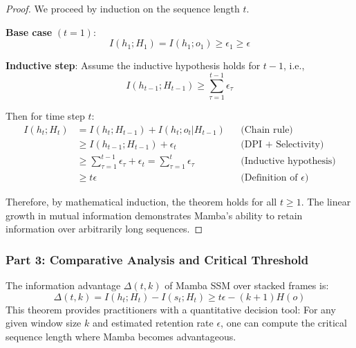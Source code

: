 \begin{proof}
We proceed by induction on the sequence length $t$.

\textbf{Base case} $(t=1)$:
\begin{equation}
    I(h_1; H_1) = I(h_1; o_1) \geq \epsilon_1 \geq \epsilon
\end{equation}

\textbf{Inductive step}:
Assume the inductive hypothesis holds for $t-1$, i.e.,
\begin{equation}
    I(h_{t-1}; H_{t-1}) \geq \sum_{\tau=1}^{t-1} \epsilon_\tau
\end{equation}

Then for time step $t$:
\begin{align}
    I(h_t; H_t) &= I(h_t; H_{t-1}) + I(h_t; o_t|H_{t-1}) && \text{(Chain rule)} \\
    &\geq I(h_{t-1}; H_{t-1}) + \epsilon_t && \text{(DPI + Selectivity)} \\
    &\geq \sum_{\tau=1}^{t-1} \epsilon_\tau + \epsilon_t = \sum_{\tau=1}^t \epsilon_\tau && \text{(Inductive hypothesis)} \\
    &\geq t\epsilon && \text{(Definition of $\epsilon$)}
\end{align}

Therefore, by mathematical induction, the theorem holds for all $t \geq 1$. The linear growth in mutual information demonstrates Mamba's ability to retain information over arbitrarily long sequences.
\end{proof}

\subsubsection{Part 3: Comparative Analysis and Critical Threshold}

\begin{theorem}
The information advantage $\Delta(t, k)$ of Mamba SSM over stacked frames is:
\begin{equation}
    \Delta(t, k) = I(h_t; H_t) - I(s_t; H_t) \geq t\epsilon - (k + 1)H(o)
\end{equation}
This theorem provides practitioners with a quantitative decision tool: For any given window size $k$ and estimated retention rate $\epsilon$, one can compute the critical sequence length where Mamba becomes advantageous.
\end{theorem}

